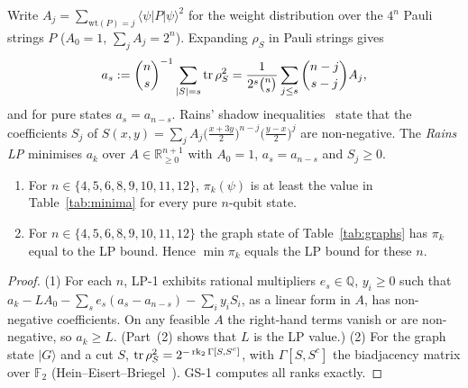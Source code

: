 Write $A_j=\sum_{\mathrm{wt}(P)=j}\langle\psi|P|\psi\rangle^2$ for the weight distribution over the
$4^n$ Pauli strings $P$ ($A_0=1$, $\sum_jA_j=2^n$). Expanding $\rho_S$ in Pauli strings gives
\begin{equation}\label{eq:as}
  a_s := \binom ns^{-1}\sum_{|S|=s}\operatorname{tr}\rho_S^2 = \frac{1}{2^s\binom ns}\sum_{j\le s}\binom{n-j}{s-j}A_j,
\end{equation}
and for pure states $a_s=a_{n-s}$. Rains' shadow inequalities~\cite{Rains} state that the coefficients
$S_j$ of $S(x,y)=\sum_jA_j\bigl(\tfrac{x+3y}{2}\bigr)^{n-j}\bigl(\tfrac{y-x}{2}\bigr)^{j}$ are
non-negative. The \emph{Rains LP} minimises $a_k$ over $A\in\mathbb R^{n+1}_{\ge0}$ with $A_0=1$,
$a_s=a_{n-s}$ and $S_j\ge0$.

\begin{theorem}\label{thm:lptable}
\begin{enumerate}
  \item For $n\in\{4,5,6,8,9,10,11,12\}$, $\pi_k(\psi)$ is at least the value in Table~\ref{tab:minima} for every pure $n$-qubit state.
  \item For $n\in\{4,5,6,8,9,10,11,12\}$ the graph state of Table~\ref{tab:graphs} has $\pi_k$ equal to
    the LP bound. Hence $\min\pi_k$ equals the LP bound for these $n$.
\end{enumerate}
\end{theorem}

\begin{proof}
(1) For each $n$, LP-1 exhibits rational multipliers $e_s\in\mathbb Q$, $y_i\ge 0$ such that
$a_k - L A_0 - \sum_s e_s(a_s-a_{n-s}) - \sum_i y_iS_i$, as a linear form in $A$, has non-negative
coefficients. On any feasible $A$ the right-hand terms vanish or are non-negative, so $a_k\ge L$.
(Part~(2) shows that $L$ is the LP value.)
(2) For the graph state $|G\rangle$ and a cut $S$, $\operatorname{tr}\rho_S^2 = 2^{-\operatorname{rk}_2\Gamma[S,S^c]}$,
with $\Gamma[S,S^c]$ the biadjacency matrix over $\mathbb F_2$ (Hein--Eisert--Briegel~\cite{HEB}).
GS-1 computes all ranks exactly. \qedhere
\end{proof}

